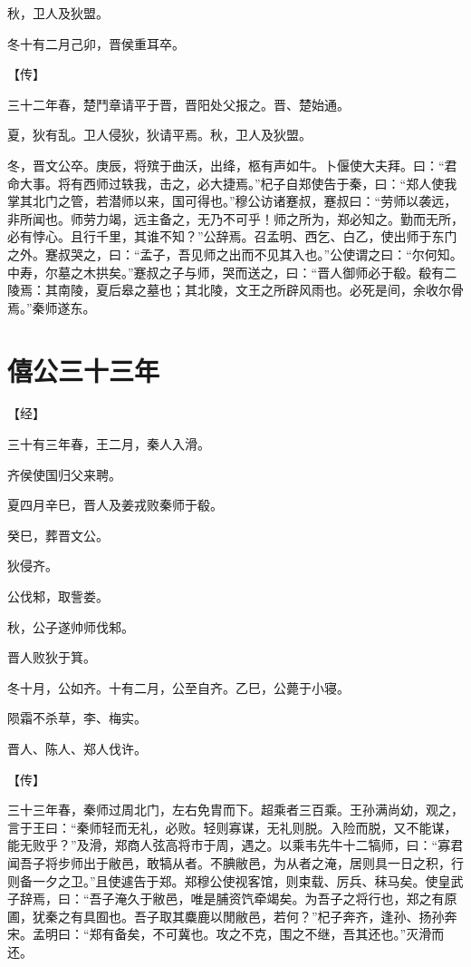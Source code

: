 \documentclass[a4paper,12pt,UTF8,twoside]{ctexbook}
\begin{document}
秋，卫人及狄盟。

冬十有二月己卯，晋侯重耳卒。

【传】

三十二年春，楚鬥章请平于晋，晋阳处父报之。晋、楚始通。

夏，狄有乱。卫人侵狄，狄请平焉。秋，卫人及狄盟。

冬，晋文公卒。庚辰，将殡于曲沃，出绛，柩有声如牛。卜偃使大夫拜。曰：“君命大事。将有西师过轶我，击之，必大捷焉。”杞子自郑使告于秦，曰：“郑人使我掌其北门之管，若潜师以来，国可得也。”穆公访诸蹇叔，蹇叔曰：“劳师以袭远，非所闻也。师劳力竭，远主备之，无乃不可乎！师之所为，郑必知之。勤而无所，必有悖心。且行千里，其谁不知？”公辞焉。召孟明、西乞、白乙，使出师于东门之外。蹇叔哭之，曰：“孟子，吾见师之出而不见其入也。”公使谓之曰：“尔何知。中寿，尔墓之木拱矣。”蹇叔之子与师，哭而送之，曰：“晋人御师必于殽。殽有二陵焉：其南陵，夏后皋之墓也；其北陵，文王之所辟风雨也。必死是间，余收尔骨焉。”秦师遂东。


\chapter{僖公三十三年}


【经】

三十有三年春，王二月，秦人入滑。

齐侯使国归父来聘。

夏四月辛巳，晋人及姜戎败秦师于殽。

癸巳，葬晋文公。

狄侵齐。

公伐邾，取訾娄。

秋，公子遂帅师伐邾。

晋人败狄于箕。

冬十月，公如齐。十有二月，公至自齐。乙巳，公薨于小寝。

陨霜不杀草，李、梅实。

晋人、陈人、郑人伐许。

【传】

三十三年春，秦师过周北门，左右免胄而下。超乘者三百乘。王孙满尚幼，观之，言于王曰：“秦师轻而无礼，必败。轻则寡谋，无礼则脱。入险而脱，又不能谋，能无败乎？”及滑，郑商人弦高将市于周，遇之。以乘韦先牛十二犒师，曰：“寡君闻吾子将步师出于敝邑，敢犒从者。不腆敝邑，为从者之淹，居则具一日之积，行则备一夕之卫。”且使遽告于郑。郑穆公使视客馆，则束载、厉兵、秣马矣。使皇武子辞焉，曰：“吾子淹久于敝邑，唯是脯资饩牵竭矣。为吾子之将行也，郑之有原圃，犹秦之有具囿也。吾子取其麋鹿以閒敝邑，若何？”杞子奔齐，逢孙、扬孙奔宋。孟明曰：“郑有备矣，不可冀也。攻之不克，围之不继，吾其还也。”灭滑而还。
\end{document}
